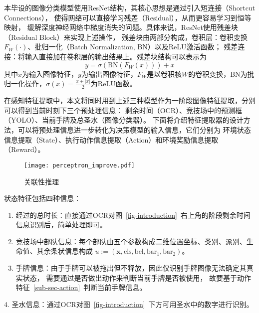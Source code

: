 本毕设的图像分类模型使用ResNet结构，其核心思想是通过引入短连接（Shortcut Connections），
使得网络可以直接学习残差（Residual），从而更容易学习到恒等映射，
缓解深度神经网络中梯度消失的问题。具体来说，ResNet使用残差块（Residual Block）来实现上述操作，
残差块由两部分构成，卷积层：卷积变换$F_W(\cdot)$、批归一化（Batch Normalization, BN）以及ReLU激活函数；
残差连接：将输入直接加在卷积层的输出结果上。残差块结构可以表示为
\begin{equation}
  y = \sigma(\text{BN}(F_W(x))) + x
\end{equation}
其中$x$为输入图像特征，$y$为输出图像特征，$F_W$是以卷积核$W$的卷积变换，BN为批归一化操作，$\sigma(x)=\frac{x+|x|}{2}$为ReLU函数。

在感知特征提取中，本文将同时用到上述三种模型作为一阶段图像特征提取，分别可以得到当前时刻下三个预处理信息：
剩余时间（OCR）、竞技场中的预测框（YOLO）、当前手牌及总圣水（图像分类器）。
下面将介绍特征提取器的设计方法，可以将预处理信息进一步转化为决策模型的输入信息，它们分别为
环境状态信息提取（State）、执行动作信息提取（Action）和环境奖励信息提取（Reward）。
\begin{wrapfigure}[13]{r}{.5\textwidth} %
  \centering
  \vspace{-1ex}
  \texttt{[image: perceptron\_improve.pdf]}
  \vspace{-1ex}
  \caption{关联性推理}
  \label{fig-state-connect}
\end{wrapfigure}
\vspace{-3ex}
状态特征包括四种信息：
\begin{enumerate}
  \item 经过的总时长：直接通过OCR对图~\ref{fig-introduction}~右上角的阶段剩余时间信息识别后，简单处理即可。
  \item 竞技场中部队信息：每个部队由五个参数构成二维位置坐标、类别、派别、生命值、其余条状信息构成
  $u:=(\boldsymbol{x}, \text{cls}, \text{bel}, \text{bar}_1, \text{bar}_2)$。
  \item 手牌信息：由于手牌可以被拖出但不释放，因此仅识别手牌图像无法确定其真实状态，
  需要通过是否做出动作来判断当前手牌是否被使用，
  故要基于动作特征~\ref{sub-sec-action}~判断当前手牌信息。
\end{enumerate}

\noindent\hspace{1em} 4. 圣水信息：通过OCR对图~\ref{fig-introduction}~下方可用圣水中的数字进行识别。


